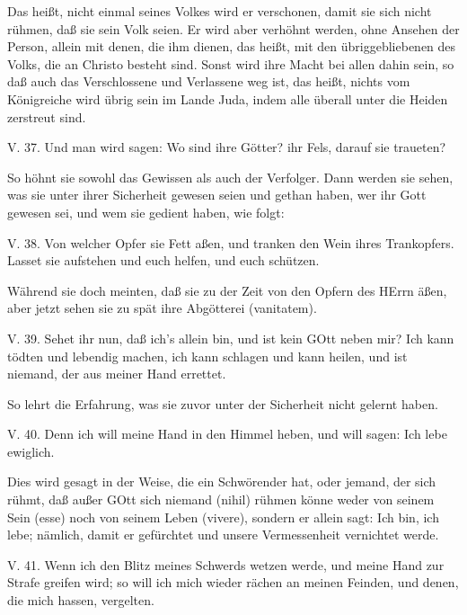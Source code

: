Das heißt, nicht einmal seines Volkes wird er verschonen, damit sie sich nicht rühmen, daß sie sein Volk seien. Er wird aber verhöhnt werden, ohne Ansehen der Person, allein mit denen, die ihm dienen, das heißt, mit den übriggebliebenen des Volks, die an Christo besteht sind. Sonst wird ihre Macht bei allen dahin sein, so daß auch das Verschlossene und Verlassene weg ist, das heißt, nichts vom Königreiche wird übrig sein im Lande Juda, indem alle überall unter die Heiden zerstreut sind.

\begin{schriftzitat}
V. 37. Und man wird sagen: Wo sind ihre Götter? ihr Fels, darauf sie traueten?
\end{schriftzitat}

So höhnt sie sowohl das Gewissen als auch der Verfolger. Dann werden sie sehen, was sie unter ihrer Sicherheit gewesen seien und gethan haben, wer ihr Gott gewesen sei, und wem sie gedient haben, wie folgt:

\begin{schriftzitat}
V. 38. Von welcher Opfer sie Fett aßen, und tranken den Wein ihres Trankopfers. Lasset sie aufstehen und euch helfen, und euch schützen.
\end{schriftzitat}

Während sie doch meinten, daß sie zu der Zeit von den Opfern des HErrn äßen, aber jetzt sehen sie zu spät ihre Abgötterei (vanitatem).

\begin{schriftzitat}
V. 39. Sehet ihr nun, daß ich’s allein bin, und ist kein GOtt neben mir? Ich kann tödten und lebendig machen, ich kann schlagen und kann heilen, und ist niemand, der aus meiner Hand errettet.
\end{schriftzitat}

So lehrt die Erfahrung, was sie zuvor unter der Sicherheit nicht gelernt haben.

\begin{schriftzitat}
V. 40. Denn ich will meine Hand in den Himmel heben, und will sagen: Ich lebe ewiglich.
\end{schriftzitat}

Dies wird gesagt in der Weise, die ein Schwörender hat, oder jemand, der sich rühmt, daß außer GOtt sich niemand (nihil) rühmen könne weder von seinem Sein (esse) noch von seinem Leben (vivere), sondern er allein sagt: Ich bin, ich lebe; nämlich, damit er gefürchtet und unsere Vermessenheit vernichtet werde.

\begin{schriftzitat}
V. 41. Wenn ich den Blitz meines Schwerds wetzen werde, und meine Hand zur Strafe greifen wird; so will ich mich wieder rächen an meinen Feinden, und denen, die mich hassen, vergelten.
\end{schriftzitat}

